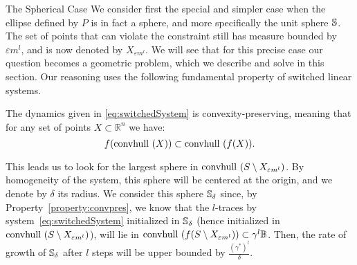 \begin{subsection}{The Spherical Case}\label{sec:pbsphere}
We consider first the special and simpler case when the ellipse defined by $P$ is in fact a sphere, and more specifically the unit sphere $\mathbb{S}$. The set of points that can violate the constraint still has measure bounded by $\varepsilon m^l$, and is now denoted by $X_{\varepsilon m^l}$. We will see that for this precise case our question becomes a geometric problem, which we describe and solve in this section. Our reasoning uses the following fundamental property of switched linear systems.

\begin{property}\label{property:convpres}
The dynamics given in \eqref{eq:switchedSystem} is convexity-preserving, meaning that for any set of points $X \subset \mathbb{R}^n$ we have:
$$ f(\mbox{convhull }({X}))\subset \mbox{convhull }(f(X)). $$
\end{property}

This leads us to look for the largest sphere in $\mbox{convhull } (S \setminus X_{\varepsilon m^l})$. By homogeneity of the system, this sphere will be centered at the origin, and we denote by $\delta$ its radius. We consider this sphere $\mathbb{S}_{\delta}$ since, by Property~\ref{property:convpres}, we know that the $l$-traces by system~\eqref{eq:switchedSystem} initialized in $\mathbb{S}_{\delta}$ (hence initialized in $\mbox{convhull } (S \setminus X_{\varepsilon m^l})$), will lie in $\mbox{convhull } (f(S \setminus X_{\varepsilon m^l})) \subset \gamma^{l} \mathbb{B}$. Then, the rate of growth of $\mathbb{S}_{\delta}$ after $l$ steps will be upper bounded by $\frac{(\gamma^{*})^{l}}{\delta}$.

\begin{figure}[H]
\begin{center}
\end{center}
\end{figure}
\end{subsection}
